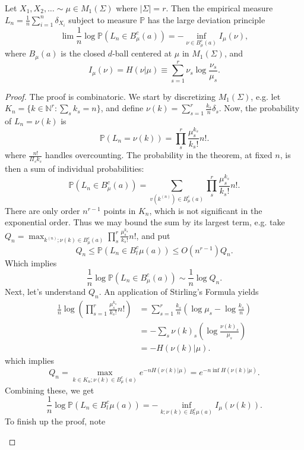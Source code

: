 \begin{theorem}
	\label{thm:Sanovthm}
	Let $X_1, X_2, \ldots \sim \mu \in M_1(\Sigma)$ where $|\Sigma| = r$. Then the empirical measure $L_n = \frac{1}{n} \sum_{i=1}^{n} \delta_{X_i}$ subject to measure $\mathbb{P}$ has the large deviation principle
\[
	\lim \frac{1}{n} \log \mathbb{P}\left( L_n \in B^c_\mu(a) \right) 
	= - \inf_{\nu \in B^c_\mu(a)} I_\mu(\nu)
,\] 
where $B_\mu(a)$ is the closed $d$-ball centered at $\mu$ in $M_1(\Sigma)$, and
\[
	I_\mu(\nu) = H(\nu | \mu) \equiv \sum_{s=1}^{r} \nu_s \log \frac{\nu_s}{\mu_s}
.\] 
\end{theorem}
\begin{proof}
	The proof is combinatoric. We start by discretizing $M_1(\Sigma)$, e.g. let $K_n = \{k \in \mathbb{N}^r: \sum_s k_s = n\} $, and define $\nu(k) = \sum_{s=1}^{r} \frac{k_s}{n} \delta_s$. Now, the probability of $L_n = \nu(k)$ is
	\[
		\mathbb{P}(L_n = \nu(k)) = 
		\prod_{s}^{r} \frac{\mu_s^{k_s}}{k_s!}n! 
	.\] 
	where $\frac{n!}{\Pi_s k_s}$ handles overcounting. The probability in the theorem, at fixed $n$, is then a sum of individual probabilities:
	\[
		\mathbb{P}\left( L_n \in B^c_\mu(a) \right) 
		= \sum_{v(k^{(n)}) \in B^c_{\mu}(a)}
		\prod_{s}^{r} \frac{\mu_s^{k_s}}{k_s!}n!
	.\] 
	There are only order $n^{r-1}$ points in $K_n$, which is not significant in the exponential order. Thus we may bound the sum by its largest term, e.g. take $Q_n = \max_{k^{(n)}; \nu(k) \in B^c_\mu(a)} \prod_{s}^{r} \frac{\mu_s^{k_s}}{k_s!}n!$, and put
	\[
		Q_n \le \mathbb{P}\left( L_n \in B^c_l\mu(a) \right) \le O(n^{r-1}) Q_n
	.\] 
	Which implies
	\[
		\frac{1}{n} \log \mathbb{P}\left( L_n \in B^c_\mu(a) \right)  \sim  \frac{1}{n} \log Q_n
	.\] 
	Next, let's understand $Q_n$. An application of Stirling's Formula yields
	\begin{align*}
		\frac{1}{n} \log \left( \prod_{s=1}^{r} \frac{\mu_s^{k_s}}{k_s!} n!  \right) 
		&= \sum_{s=1}^{r} \frac{k_s}{n} \left( \log \mu_s - \log \frac{k_s}{n} \right)  \\
		&= - \sum_s \nu(k)_s \left( \log \frac{\nu(k)_s}{\mu_s} \right)  \\
		&= - H(\nu(k)| \mu)
	.\end{align*} 
	which implies
	\[
		Q_n = \max_{k \in K_n; \nu(k) \in B^c_\mu(a)} e^{- n H(\nu(k) | \mu)}
		= e^{-n \inf H(\nu(k) | \mu)}
	.\] 
	Combining these, we get
	\[
		\frac{1}{n} \log \mathbb{P}\left(L_n \in B^c_l\mu(a)\right)
		= - \inf _{k; \nu(k) \in B^c_l\mu(a)} I_\mu(\nu(k))
	.\] 
	To finish up the proof, note
	\begin{itemize}

\end{itemize}
\end{proof}
